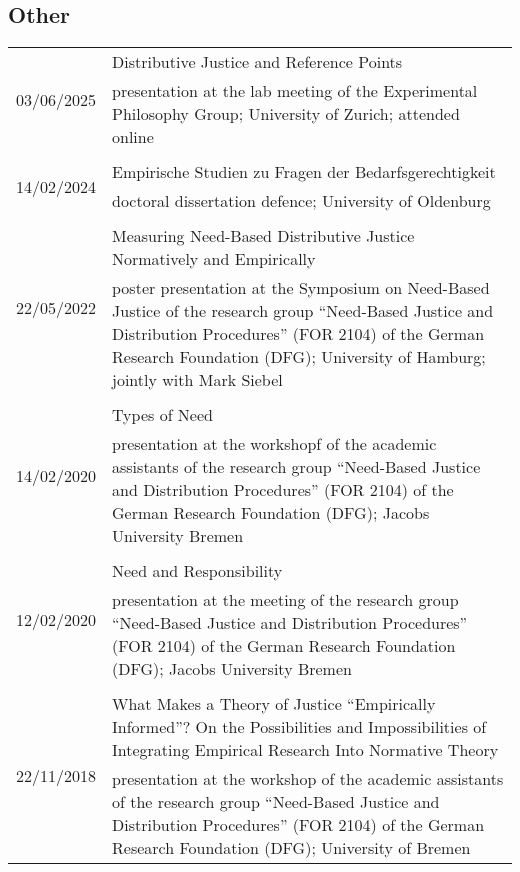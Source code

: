 \documentclass[a4paper,10pt]{article}
\begin{document}
\subsection*{Other}
\begin{longtable}{p{2.5cm}p{11cm}}
\multirow{2}{2.5cm}{\footnotesize{03/06/2025}} & Distributive Justice and Reference Points\\
& \footnotesize{presentation at the lab meeting of the Experimental Philosophy Group; University of Zurich; attended online}\\
\\
\multirow{2}{2.5cm}{\footnotesize{14/02/2024}} & Empirische Studien zu Fragen der Bedarfsgerechtigkeit\\
& \footnotesize{doctoral dissertation defence; University of Oldenburg}\\
\\
\multirow{2}{2.5cm}{\footnotesize{22/05/2022}} & Measuring Need-Based Distributive Justice Normatively and Empirically\\
& \footnotesize{poster presentation at the Symposium on Need-Based Justice of the research group \enquote{Need-Based Justice and Distribution Procedures} (FOR 2104) of the German Research Foundation (DFG); University of Hamburg; jointly with Mark Siebel}\\
\\
\multirow{2}{2.5cm}{\footnotesize{14/02/2020}} & Types of Need\\
& \footnotesize{presentation at the workshopf of the academic assistants of the research group \enquote{Need-Based Justice and Distribution Procedures} (FOR 2104) of the German Research Foundation (DFG); Jacobs University Bremen}\\
\\
\multirow{2}{2.5cm}{\footnotesize{12/02/2020}} & Need and Responsibility\\
& \footnotesize{presentation at the meeting of the research group \enquote{Need-Based Justice and Distribution Procedures} (FOR 2104) of the German Research Foundation (DFG); Jacobs University Bremen}\\
\\
\multirow{2}{2.5cm}{\footnotesize{22/11/2018}} & What Makes a Theory of Justice \enquote{Empirically Informed}? On the Possibilities and Impossibilities of Integrating Empirical Research Into Normative Theory\\
& \footnotesize{presentation at the workshop of the academic assistants of the research group \enquote{Need-Based Justice and Distribution Procedures} (FOR 2104) of the German Research Foundation (DFG); University of Bremen}\\

\end{longtable}
\end{document}
